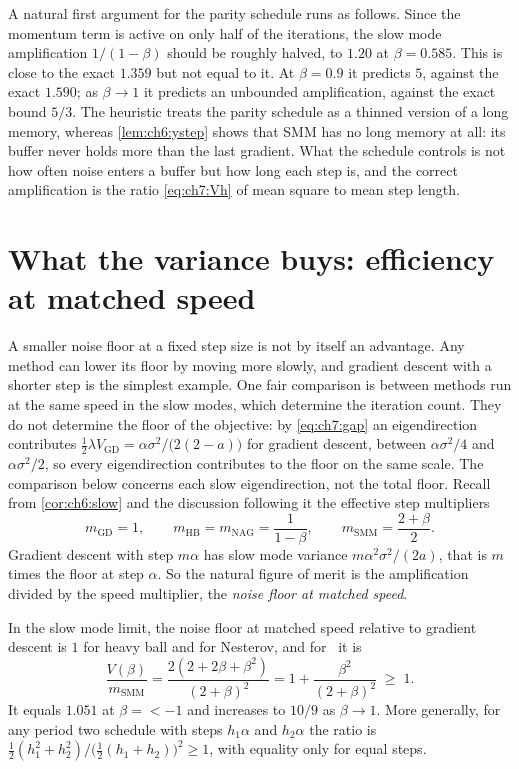 \begin{remark}\label{rem:ch7:heuristic}
A natural first argument for the parity schedule runs as follows. Since the
momentum term is active on only half of the iterations, the slow mode
amplification $1/(1-\beta)$ should be roughly halved, to $1.20$ at
$\beta=0.585$. This is close to the exact $1.359$ but not equal to it. At
$\beta=0.9$ it predicts $5$, against the exact $1.590$; as $\beta\to1$ it
predicts an unbounded amplification, against the exact bound $5/3$. The
heuristic treats the parity schedule as a thinned version of a long memory,
whereas \cref{lem:ch6:ystep} shows that SMM has no long memory at all: its
buffer never holds more than the last gradient. What the schedule controls is
not how often noise enters a buffer but how long each step is, and the correct
amplification is the ratio \eqref{eq:ch7:Vh} of mean square to mean step length.
\end{remark}

\section{What the variance buys: efficiency at matched speed}\label{sec:ch7:efficiency}

A smaller noise floor at a fixed step size is not by itself an advantage. Any
method can lower its floor by moving more slowly, and gradient descent with a
shorter step is the simplest example.
One fair comparison is between methods run at the same speed in the slow modes, which determine the iteration count.
They do not determine the floor of the objective: by \eqref{eq:ch7:gap} an eigendirection contributes $\tfrac12\lambda V_{\mathrm{GD}}=\alpha\sigma^2/\bigl(2(2-a)\bigr)$ for gradient descent, between $\alpha\sigma^2/4$ and $\alpha\sigma^2/2$, so every eigendirection contributes to the floor on the same scale.
The comparison below concerns each slow eigendirection, not the total floor.
Recall from \cref{cor:ch6:slow} and the discussion following it the effective
step multipliers
\[
  m_{\mathrm{GD}}=1,\qquad m_{\mathrm{HB}}=m_{\mathrm{NAG}}=\frac1{1-\beta},\qquad
  m_{\mathrm{SMM}}=\frac{2+\beta}{2}.
\]
Gradient descent with step $m\alpha$ has slow mode variance
$m\alpha^2\sigma^2/(2a)$, that is $m$ times the floor at step $\alpha$. So the
natural figure of merit is the amplification divided by the speed multiplier,
the \emph{noise floor at matched speed}.

\begin{proposition}\label{prop:ch7:matched}
In the slow mode limit, the noise floor at matched speed relative to gradient
descent is $1$ for heavy ball and for Nesterov, and for \smmdet\ it is
\[
  \frac{V(\beta)}{m_{\mathrm{SMM}}}=\frac{2(2+2\beta+\beta^2)}{(2+\beta)^2}
  =1+\frac{\beta^2}{(2+\beta)^2}\;\ge\;1 .
\]
It equals $1.051$ at $\beta=\lt-1$ and increases to $10/9$ as $\beta\to1$.
More generally, for any period two schedule with steps $h_1\alpha$ and
$h_2\alpha$ the ratio is $\tfrac12(h_1^2+h_2^2)\big/\bigl(\tfrac12(h_1+h_2)\bigr)^2\ge1$,
with equality only for equal steps.
\end{proposition}

